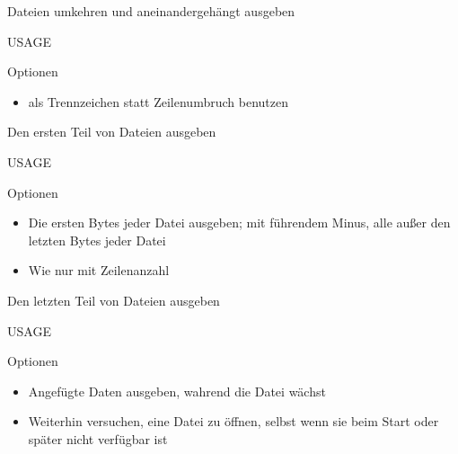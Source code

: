 \documentclass[aspectratio=43]{beamer}
\begin{document}
\begin{frame} 
	\begin{block}{} 
        Dateien umkehren und aneinandergehängt ausgeben
	\end{block}
	\begin{block}{USAGE} 
	\end{block}
	\begin{exampleblock}{Optionen} 
	\begin{itemize}
	\item {}  
	\newline {} als Trennzeichen statt Zeilenumbruch benutzen
	\end{itemize}
	\end{exampleblock}
\end{frame}

\begin{frame} 
	\begin{block}{} 
        Den ersten Teil von Dateien ausgeben
	\end{block}
	\begin{block}{USAGE} 
	\end{block}
	\begin{exampleblock}{Optionen} 
	\begin{itemize}
	\item {} \newline Die ersten  Bytes jeder Datei ausgeben; mit führendem Minus, alle außer den letzten  Bytes jeder Datei	
	\item {}\newline Wie  nur mit Zeilenanzahl 
	\end{itemize}
	
	\end{exampleblock}
\end{frame}

\begin{frame} 
	\begin{block}{} 
        Den letzten Teil von Dateien ausgeben
	\end{block}
	\begin{block}{USAGE} 
	\end{block}
	\begin{exampleblock}{Optionen} 
	\begin{itemize}
	\item {} \newline Angefügte Daten ausgeben,  wahrend  die  Datei  wächst	
	\item {}\newline  Weiterhin  versuchen, eine Datei zu öffnen, selbst wenn sie beim
              Start oder später nicht verfügbar ist
	\end{itemize}
	
	\end{exampleblock}
\end{frame}
\end{document}
